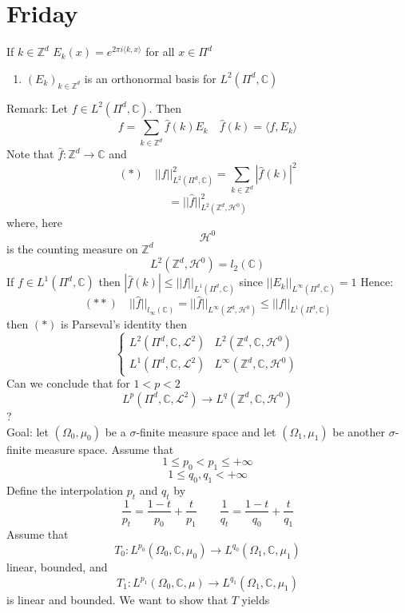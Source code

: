 \documentclass[11pt]{article}
\begin{document}
\section{Friday}
If $k \in \mathbb{Z}^{d}$ $E_k(x) = e^{2\pi i \langle k , x \rangle}$ for all $x \in \Pi^{d}$
\begin{enumerate}
    \item $(E_k)_{k \in \mathbb{Z}^{d}}$ is an orthonormal basis 
        for $L^2(\Pi^{d}, \mathbb{C})$
\end{enumerate}
Remark: Let $f \in L^2(\Pi^{d}, \mathbb{C})$. Then
\[
f = \sum_{k \in \mathbb{Z}^{d}}^{}\hat f(k) E_k \quad \hat f(k) = \langle f, E_k \rangle
\] 
Note that $\hat f : \mathbb{Z}^{d} \to \mathbb{C}$ and
\[
    (*) \quad   ||f||_{L^2(\Pi^{d}, \mathbb{C})}^{2} = \sum_{k \in \mathbb{Z}^{d}}^{}|\hat f (k)|^2
\] 
\[
    = ||\hat f||_{L^2( \mathbb{Z}^{d}, \mathcal{H}^{0})}^{2}
\] 
where, here
\[
    \mathcal{H}^{0}
\] 
is the counting measure on $ \mathbb{Z}^{d}$ 
\[
    L^2( \mathbb{Z}^{d}, \mathcal{H}^{0}) = l_2( \mathbb{C})
\] 
If $f \in L^{1}(\Pi^{d}, \mathbb{C})$ then $|\hat f(k)| \le ||f||_{L^{1}(\Pi^{d}, \mathbb{C})}$ since $||E_k||_{L^{\infty}(\Pi^{d}, \mathbb{C})} = 1$
Hence: 
\[
    (**) \quad    ||\hat f||_{l_{\infty}( \mathbb{C})} = ||\hat f||_{L^{\infty}(Z^{d}, \mathcal{H}^{0})} \le ||f||_{L^{1}( \Pi^{d}, \mathbb{C})}
\] 
then $(*)$ is Parseval's identity
then
\[
\begin{cases}
    L^{2}(\Pi^{d}, \mathbb{C}, \mathcal{L}^2) & L^2( \mathbb{Z}^{d}, \mathbb{C}, \mathcal{H}^{0})\\
    L^{1}(\Pi^{d}, \mathbb{C}, \mathcal{L}^2) & L^{\infty}( \mathbb{Z}^{d}, \mathbb{C}, \mathcal{H}^{0})
\end{cases}
\] 
Can we conclude that for $1 < p < 2$
\[
    L^{p}(\Pi^{d}, \mathbb{C}, \mathcal{L}^{2}) \to L^{q}( \mathbb{Z}^{d}, \mathbb{C}, \mathcal{H}^{0})
\]?\\
Goal: let $(\Omega_0, \mu_0)$ be a $\sigma$-finite measure space
and let $(\Omega_1, \mu_1)$ be another $\sigma$-finite measure space. Assume that
\[
    1 \le p_0 < p_1 \le +\infty
\] 
\[
1 \le q_0, q_1 < +\infty
\] 
Define the interpolation $p_t$ and  $q_t$ by
 \[
\frac{1}{p_t} = \frac{1-t}{p_0} + \frac{t}{p_1} \qquad \frac{1}{q_t} = \frac{1-t}{q_0} + \frac{t}{q_1}
\] 
Assume that
\[
T_0 : L^{p_0}(\Omega_0, \mathbb{C}, \mu_0) \to L^{q_0}(\Omega_1, \mathbb{C}, \mu_1)
\] 
linear, bounded, and 
\[
T_1: L^{p_1}( \Omega_0, \mathbb{C}, \mu) \to L^{q_1}(\Omega_1, \mathbb{C}, \mu_1)
\] 
is linear and bounded. We want to show that $T$ yields
\end{document}
